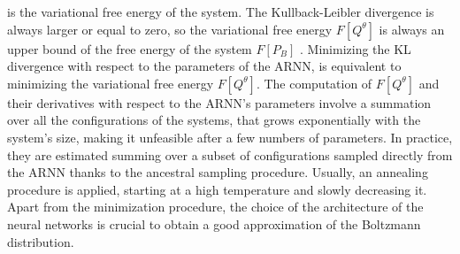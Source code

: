 \documentclass[aps,physrev,10pt,floatfix,reprint]{revtex4-2}
\begin{document}
is the variational free energy of the system. The Kullback-Leibler divergence is always larger or equal to zero, so the variational free energy $F[Q^{\theta}]$ is always an upper bound of the free energy of the system $F[P_{B}]$ \cite{Wu2019}. Minimizing the KL divergence with respect to the parameters of the ARNN, is equivalent to minimizing the variational free energy $F[Q^{\theta}]$. The computation of $F[Q^{\theta}]$ and their derivatives with respect to the ARNN's parameters involve a summation over all the configurations of the systems, that grows exponentially with the system's size, making it unfeasible after a few numbers of parameters. In practice, they are estimated summing over a subset of configurations sampled directly from the ARNN thanks to the ancestral sampling procedure\cite{Wu2019}. Usually, an annealing procedure is applied, starting at a high temperature and slowly decreasing it.
Apart from the minimization procedure, the choice of the architecture of the neural networks is crucial to obtain a good approximation of the Boltzmann distribution.
\end{document}
